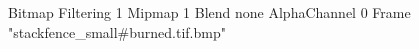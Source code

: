 {Bitmap
	{Filtering 1}
	{Mipmap 1}
	{Blend none}
	{AlphaChannel 0}
	{Frame "stackfence_small#burned.tif.bmp"}
}
